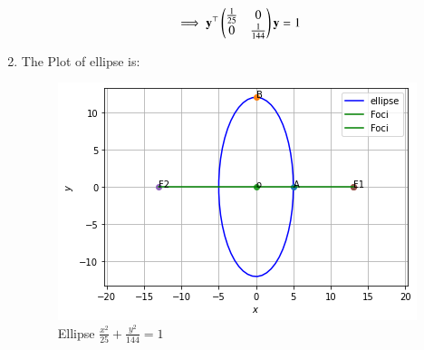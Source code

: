 \documentclass[journal,12pt,twocolumn]{IEEEtran}
\begin{document}
\begin{enumerate}
\begin{align}
\implies \mathbf{y}^{\top}\begin{pmatrix}\frac{1}{25}& 0 \\ 0 & \frac{1}{144}\end{pmatrix}\mathbf{y}=1
\end{align}
\item The Plot of ellipse is:
\begin{figure}[!ht]
    \centering
    \includegraphics[width=\columnwidth]{figure6.png}
    \caption{Ellipse $\frac{x^2}{25} + \frac{y^2}{144} = 1$}
    \label{fig:ellipse}
\end{figure} 
\end{enumerate}
\end{document}
